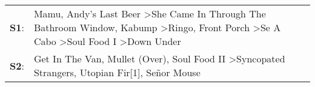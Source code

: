 \begin{supertabular}{p{0.03\textwidth}p{0.92\textwidth}}
 \textbf{S1}:  &  Mamu\textsuperscript{}, \enspace Andy's Last Beer\textsuperscript{} \textgreater \enspace She Came In Through The Bathroom Window\textsuperscript{}, \enspace Kabump\textsuperscript{} \textgreater \enspace Ringo\textsuperscript{}, \enspace Front Porch\textsuperscript{} \textgreater \enspace Se A Cabo\textsuperscript{} \textgreater \enspace Soul Food I\textsuperscript{} \textgreater \enspace Down Under\textsuperscript{}  \enspace  \\
 \textbf{S2}:  &                                                                                                                                                                    Get In The Van\textsuperscript{}, \enspace Mullet (Over)\textsuperscript{}, \enspace Soul Food II\textsuperscript{} \textgreater \enspace Syncopated Strangers\textsuperscript{}, \enspace Utopian Fir[1]\textsuperscript{}, \enspace Señor Mouse\textsuperscript{}  \enspace  \\
\end{supertabular}
